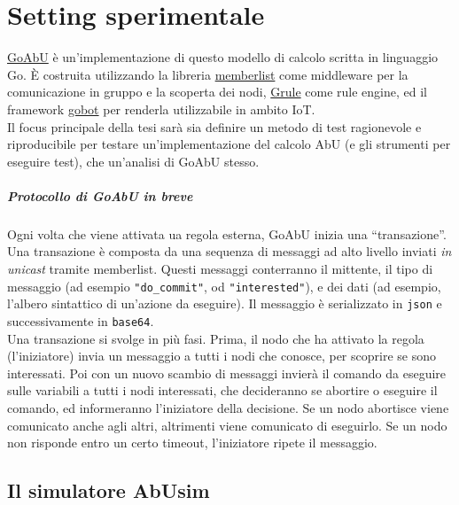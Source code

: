 \documentclass[target=bach]{thud}
\begin{document}
\chapter{Setting sperimentale}\label{setting}

\href{https://github.com/abu-lang/goabu}{GoAbU} è un'implementazione di questo modello di calcolo scritta in linguaggio Go.
È costruita utilizzando la libreria \href{https://github.com/hashicorp/memberlist}{memberlist} come middleware per la comunicazione in gruppo e la scoperta dei nodi,  \href{https://github.com/hyperjumptech/grule-rule-engine}{Grule} come rule engine, ed il framework \href{https://github.com/hybridgroup/gobot/}{gobot} per renderla utilizzabile in ambito IoT.\\
Il focus principale della tesi sarà sia definire un metodo di test ragionevole e riproducibile per testare un'implementazione del calcolo AbU (e gli strumenti per eseguire test), che un'analisi di GoAbU stesso.

\paragraph{Protocollo di GoAbU in breve} Ogni volta che viene attivata ua regola esterna, GoAbU inizia una ``transazione''. Una transazione è composta da una sequenza di messaggi ad alto livello inviati \emph{in unicast} tramite memberlist.
Questi messaggi conterranno il mittente, il tipo di messaggio (ad esempio \lstinline{"do_commit"}, od \lstinline{"interested"}), e dei dati (ad esempio, l'albero sintattico di un'azione da eseguire). Il messaggio è serializzato in \lstinline{json} e successivamente in \lstinline{base64}.\\
Una transazione si svolge in più fasi. Prima, il nodo che ha attivato la regola (l'iniziatore) invia un messaggio a tutti i nodi che conosce, per scoprire se sono interessati.
Poi con un nuovo scambio di messaggi invierà il comando da eseguire sulle variabili a tutti i nodi interessati, che decideranno se abortire o eseguire il comando, ed informeranno l'iniziatore della decisione. Se un nodo abortisce viene comunicato anche agli altri, altrimenti viene comunicato di eseguirlo.
Se un nodo non risponde entro un certo timeout, l'iniziatore ripete il messaggio.

\section{Il simulatore AbUsim}\label{setting:abusim}
\end{document}
